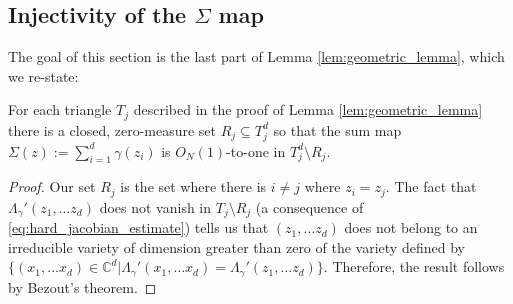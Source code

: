 	\subsection{Injectivity of the $\Sigma$ map} %
	\label{sub:injectivity_of_the_}

	The goal of this section is the last part of Lemma \ref{lem:geometric_lemma}, which we re-state:

	\begin{lemma}
		For each triangle $T_j$ described in the proof of Lemma \ref{lem:geometric_lemma} there is a closed, zero-measure set $R_j \subseteq T_j^d$ so that the sum map $\Sigma(z):=\sum_{i=1}^d \gamma(z_i)$ is $O_N(1)$-to-one in $T_j^d\setminus R_j$.
	\end{lemma}
	

	\begin{proof}
		Our set $R_j$ is the set where there is $i\neq j$ where $z_i=z_j$. The fact that $\Lambda_\gamma'(z_1, \dots z_d)$ does not vanish in $T_j\setminus R_j$ (a consequence of \eqref{eq:hard_jacobian_estimate}) tells us that $(z_1, \dots z_d)$ does not belong to an irreducible variety of dimension greater than zero of the variety defined by $\{(x_1, \dots x_d) \in \mathbb C^d | \Lambda_\gamma'(x_1, \dots x_d) = \Lambda_\gamma'(z_1, \dots z_d)\}$. Therefore, the result follows by Bezout's theorem.
	\end{proof}
